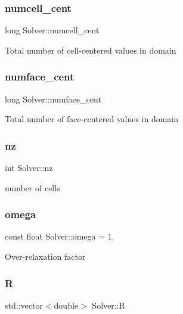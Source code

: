 \subsubsection{\texorpdfstring{numcell\+\_\+cent}{numcell\_cent}}
{\footnotesize\ttfamily long Solver\+::numcell\+\_\+cent\hspace{0.3cm}{\ttfamily [protected]}}

Total number of cell-\/centered values in domain \mbox{\label{classSolver_a2da3e1b65b167e21ba94610c3c2a8b9e}} 
\subsubsection{\texorpdfstring{numface\+\_\+cent}{numface\_cent}}
{\footnotesize\ttfamily long Solver\+::numface\+\_\+cent\hspace{0.3cm}{\ttfamily [protected]}}

Total number of face-\/centered values in domain \mbox{\label{classSolver_a4312c5a1ff7a5eba3eb8d7ef3fed0190}} 
\subsubsection{\texorpdfstring{nz}{nz}}
{\footnotesize\ttfamily int Solver\+::nz\hspace{0.3cm}{\ttfamily [protected]}}

number of cells \mbox{\label{classSolver_a5b7c9bb1344ba12a12fbf1820d2b1711}} 
\subsubsection{\texorpdfstring{omega}{omega}}
{\footnotesize\ttfamily const float Solver\+::omega = 1.\hspace{0.3cm}{\ttfamily [protected]}}

Over-\/relaxation factor \mbox{\label{classSolver_aaca74be9e1a11be0c7a480c4202670e7}} 
\subsubsection{\texorpdfstring{R}{R}}
{\footnotesize\ttfamily std\+::vector$<$double$>$ Solver\+::R\hspace{0.3cm}{\ttfamily [protected]}}

